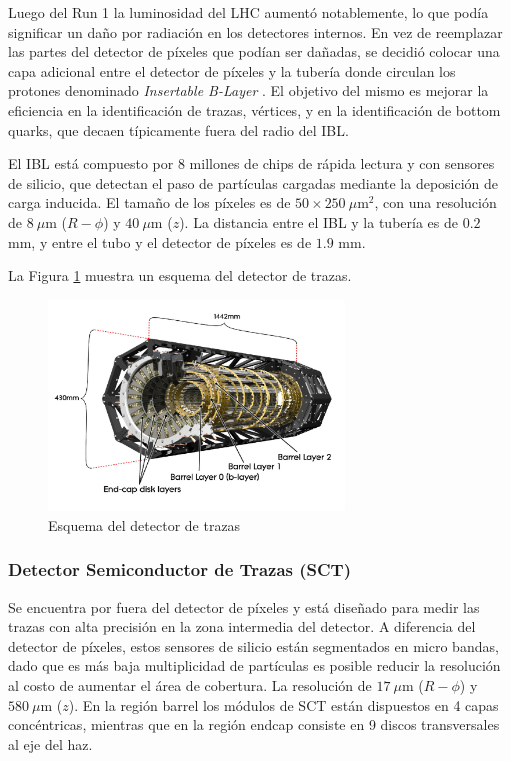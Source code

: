 Luego del Run 1 la luminosidad del LHC aumentó notablemente, lo que podía significar un daño por radiación en los detectores internos. En vez de reemplazar las partes del detector de píxeles que podían ser dañadas, se decidió colocar una capa adicional entre el detector de píxeles y la tubería donde circulan los protones denominado \textit{Insertable B-Layer} \cite{ATLAS-TDR-2010-19}. El objetivo del mismo es mejorar la eficiencia en la identificación de trazas, vértices, y en la identificación de bottom quarks, que decaen típicamente fuera del radio del IBL.

El IBL está compuesto por $8$ millones de chips de rápida lectura y con sensores de silicio, que detectan el paso de partículas cargadas mediante la deposición de carga inducida. El tamaño de los píxeles es de $50\times250\:\mu$m$^{2}$, con una resolución de $8\:\mu$m ($R-\phi$) y $40\:\mu$m ($z$). La distancia entre el IBL y la tubería es de $0.2$ mm, y entre el tubo y el detector de píxeles es de $1.9$ mm. 

La Figura \ref{pixel_3} muestra un esquema del detector de trazas.


\begin{figure}
  \centering
  \includegraphics[width=0.7\textwidth]{images/pixel_3.png}
  \caption{Esquema del detector de trazas}
  \label{pixel_3}
\end{figure}

\subsubsection{Detector Semiconductor de Trazas (SCT)}

Se encuentra por fuera del detector de píxeles y está diseñado para medir las trazas con alta precisión en la zona intermedia del detector. A diferencia del detector de píxeles, estos sensores de silicio están segmentados en micro bandas, dado que es más baja multiplicidad de partículas es posible reducir la resolución al costo de aumentar el área de cobertura. La resolución de $17\:\mu$m ($R-\phi$) y $580\:\mu$m ($z$). En la región barrel los módulos de SCT están dispuestos en 4 capas concéntricas, mientras que en la región endcap consiste en 9 discos transversales al eje del haz.

